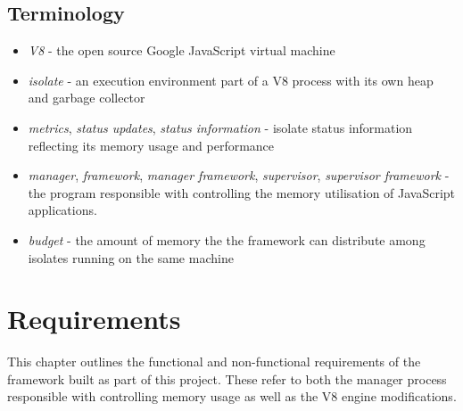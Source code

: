 \documentclass{l4proj}
\begin{document}
\section{Terminology}
\begin{itemize}
\item \textit{V8} - the open source Google JavaScript virtual machine
\item \textit{isolate} - an execution environment part of a V8 process with its own heap and garbage collector
\item \textit{metrics}, \textit{status updates}, \textit{status information} - isolate status information reflecting its memory usage and performance
\item \textit{manager}, \textit{framework}, \textit{manager framework}, \textit{supervisor}, \textit{supervisor framework} - the program responsible with controlling the memory utilisation of JavaScript applications.
\item \textit{budget} - the amount of memory the the framework can distribute among isolates running on the same machine
\end{itemize}
\chapter{Requirements}
\hspace*{1em} This chapter outlines the functional and non-functional requirements of the framework built as part of this project. These refer to both the manager process responsible with controlling memory usage as well as the V8 engine modifications.
\end{document}
